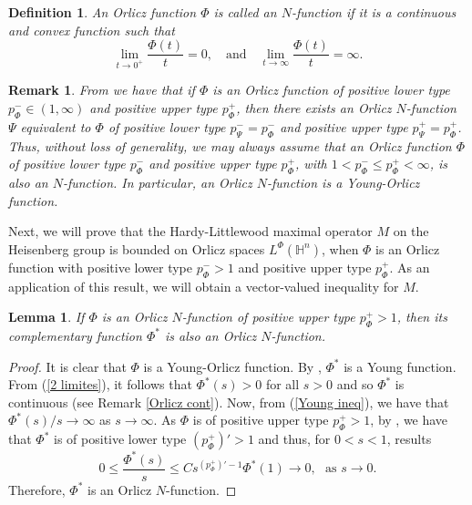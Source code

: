 \documentclass[oneside,10pt]{article}
\newtheorem{definition}[theorem]{Definition}
\newtheorem{lemma}[theorem]{Lemma}
\newtheorem{remark}[theorem]{Remark}
\begin{document}
\begin{definition}
An Orlicz function $\Phi$ is called an $N$-function if it is a continuous and convex function such that
\begin{equation} \label{2 limites}
\lim_{t \to 0^{+}} \frac{\Phi(t)}{t} = 0, \,\,\,\,\,\, \text{and} \,\,\,\,\,\,  \lim_{t \to \infty} \frac{\Phi(t)}{t} = \infty.
\end{equation}
\end{definition}

\begin{remark} \label{N funct}
From \cite[Lemma 2.16]{Zhang} we have that if $\Phi$ is an Orlicz function of positive lower type $p_{\Phi}^{-} \in (1, \infty)$ and 
positive upper type $p_{\Phi}^{+}$, then there exists an Orlicz $N$-function $\Psi$ equivalent to $\Phi$ of positive lower type 
$p_{\Psi}^{-} = p_{\Phi}^{-}$ and positive upper type $p_{\Psi}^{+} = p_{\Phi}^{+}$. Thus, without loss of generality, we may always 
assume that an Orlicz function $\Phi$ of positive lower type $p_{\Phi}^{-}$ and positive upper type $p_{\Phi}^{+}$, with 
$1 < p_{\Phi}^{-} \leq p_{\Phi}^{+} < \infty$, is also an $N$-function. In particular, an Orlicz $N$-function is a Young-Orlicz function.
\end{remark}


Next, we will prove that the Hardy-Littlewood maximal operator $M$ on the Heisenberg group is bounded on Orlicz spaces 
$L^{\Phi}(\mathbb{H}^n)$, when $\Phi$ is an Orlicz function with positive lower type $p_{\Phi}^{-} > 1$ and positive upper type 
$p_{\Phi}^{+}$. As an application of this result, we will obtain a vector-valued inequality for $M$. 

\begin{lemma} \label{N compl}
If $\Phi$ is an Orlicz $N$-function of positive upper type $p_{\Phi}^{+} > 1$, then its complementary function $\Phi^{*}$ is also an Orlicz 
$N$-function.
\end{lemma}

\begin{proof}
It is clear that $\Phi$ is a Young-Orlicz function. By \cite[Lemma 2.4.2]{Hasto}, $\Phi^{*}$ is a Young function. From (\ref{2 limites}), it follows that $\Phi^{*}(s) > 0$ for all $s >0$ and so $\Phi^{*}$ is continuous (see Remark \ref{Orlicz cont}). Now, from (\ref{Young ineq}), 
we have that $\Phi^{*}(s)/s \to \infty$ as $s \to \infty$. As $\Phi$ is of positive upper type $p_{\Phi}^{+} > 1$, by 
\cite[Proposition 7.8]{sawa}, we have that $\Phi^{*}$ is of positive lower type $(p_{\Phi}^{+})' > 1$ and thus, for $0 < s < 1$, results
\[
0 \leq \frac{\Phi^{*}(s)}{s} \leq C s^{(p_{\Phi}^{+})' - 1} \Phi^{*}(1) \to 0, \,\,\,\, \text{as} \,\, s \to 0.
\]
Therefore, $\Phi^{*}$ is an Orlicz $N$-function.
\end{proof}
\end{document}
